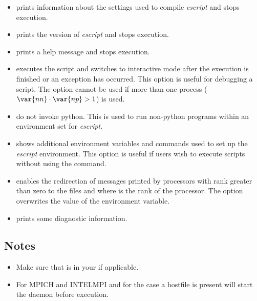 \begin{itemize}
\item[\programopt{-c}] prints information about the settings used to compile {\it escript} and stops execution.

\item[\programopt{-V}] prints the version of {\it escript} and stops execution.

\item[\programopt{-h}] prints a help message and stops execution.

\item[\programopt{-i}] executes the script  and switches to
    interactive mode after the execution is finished or an exception has occurred.
    This option is useful for debugging a script.
    The option cannot be used if more than one process ($\var{nn} \cdot \var{np}>1$) is used.

\item[\programopt{-b}] do not invoke python. This is used to run non-python
    programs within an environment set for {\it escript}.

\item[\programopt{-e}] shows additional environment variables and commands
    used to set up the {\it escript} environment.
    This option is useful if users wish to execute scripts without using
    the  command.

\item[\programopt{-o}] enables the redirection of messages printed by
    processors with \MPI rank greater than zero to the files
     and  where  is
    the rank of the processor.
    The option overwrites the value of the  environment
    variable.


\item[\programopt{-v}] prints some diagnostic information.
\end{itemize}

\subsection{Notes}
\begin{itemize}
 \item Make sure that  is in your  if applicable. 
 \item For MPICH and INTELMPI and for the case a hostfile is present 
 will start the  daemon before execution.
\end{itemize}

